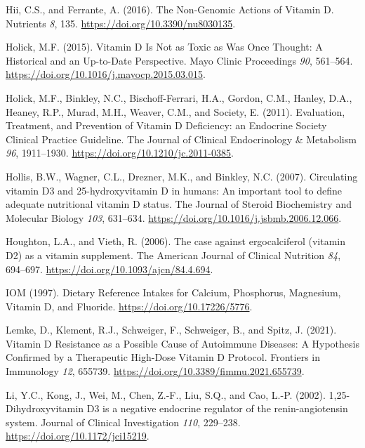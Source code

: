 \documentclass[
  a4paper,
  DIV=11,
  numbers=noendperiod,
  listof=totoc]{scrreprt}
\newlength{\cslhangindent}
\newlength{\cslentryspacingunit} %
\newenvironment{CSLReferences}[2] %
 {%
  \setlength{\parindent}{0pt}
  \ifodd #1
  \let\oldpar\par
  \def\par{\hangindent=\cslhangindent\oldpar}
  \fi
  \setlength{\parskip}{#2\cslentryspacingunit}
 }%
 {}
\begin{document}
\begin{CSLReferences}{0}{0}
\leavevmode{}%
Hii, C.S., and Ferrante, A. (2016). {The Non-Genomic Actions of Vitamin
D}. Nutrients \emph{8}, 135. \url{https://doi.org/10.3390/nu8030135}.

\leavevmode{}%
Holick, M.F. (2015). {Vitamin D Is Not as Toxic as Was Once Thought: A
Historical and an Up-to-Date Perspective}. Mayo Clinic Proceedings
\emph{90}, 561--564. \url{https://doi.org/10.1016/j.mayocp.2015.03.015}.

\leavevmode{}%
Holick, M.F., Binkley, N.C., Bischoff-Ferrari, H.A., Gordon, C.M.,
Hanley, D.A., Heaney, R.P., Murad, M.H., Weaver, C.M., and Society, E.
(2011). {Evaluation, Treatment, and Prevention of Vitamin D Deficiency:
an Endocrine Society Clinical Practice Guideline}. The Journal of
Clinical Endocrinology \& Metabolism \emph{96}, 1911--1930.
\url{https://doi.org/10.1210/jc.2011-0385}.

\leavevmode{}%
Hollis, B.W., Wagner, C.L., Drezner, M.K., and Binkley, N.C. (2007).
{Circulating vitamin D3 and 25-hydroxyvitamin D in humans: An important
tool to define adequate nutritional vitamin D status}. The Journal of
Steroid Biochemistry and Molecular Biology \emph{103}, 631--634.
\url{https://doi.org/10.1016/j.jsbmb.2006.12.066}.

\leavevmode{}%
Houghton, L.A., and Vieth, R. (2006). {The case against ergocalciferol
(vitamin D2) as a vitamin supplement}. The American Journal of Clinical
Nutrition \emph{84}, 694--697.
\url{https://doi.org/10.1093/ajcn/84.4.694}.

\leavevmode{}%
IOM (1997). {Dietary Reference Intakes for Calcium, Phosphorus,
Magnesium, Vitamin D, and Fluoride}.
\url{https://doi.org/10.17226/5776}.

\leavevmode{}%
Lemke, D., Klement, R.J., Schweiger, F., Schweiger, B., and Spitz, J.
(2021). {Vitamin D Resistance as a Possible Cause of Autoimmune
Diseases: A Hypothesis Confirmed by a Therapeutic High-Dose Vitamin D
Protocol}. Frontiers in Immunology \emph{12}, 655739.
\url{https://doi.org/10.3389/fimmu.2021.655739}.

\leavevmode{}%
Li, Y.C., Kong, J., Wei, M., Chen, Z.-F., Liu, S.Q., and Cao, L.-P.
(2002). {1,25-Dihydroxyvitamin D3 is a negative endocrine regulator of
the renin-angiotensin system}. Journal of Clinical Investigation
\emph{110}, 229--238. \url{https://doi.org/10.1172/jci15219}.


\end{CSLReferences}
\end{document}
